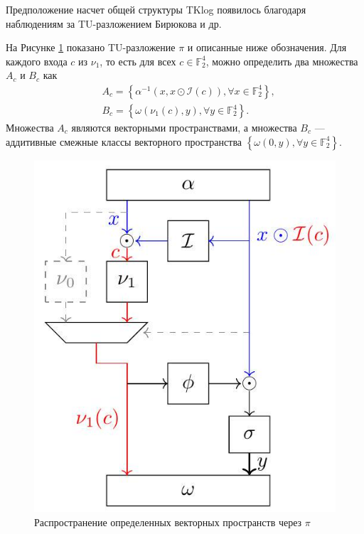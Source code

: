 
Предположение насчет общей структуры TKlog появилось благодаря наблюдениям за TU-разложением Бирюкова и др.

На Рисунке \ref{fig:figC01} показано TU-разложение $\pi$ и описанные ниже обозначения. Для каждого входа $c$ из $\nu_{1}$, то есть для всех $c \in \mathbb{F}_{2}^{4}$, можно определить два множества $A_{c}$ и $B_{c}$ как
$$
\begin{aligned}
& A_{c}=\left\{\alpha^{-1}(x, x \odot \mathcal{I}(c)), \forall x \in \mathbb{F}_{2}^{4}\right\}, \\
& B_{c}=\left\{\omega\left(\nu_{1}(c), y\right), \forall y \in \mathbb{F}_{2}^{4}\right\} .
\end{aligned}
$$
Множества $A_{c}$ являются векторными пространствами, а множества $B_{c}$ — аддитивные смежные классы векторного пространства $\left\{\omega(0, y), \forall y \in \mathbb{F}_{2}^{4}\right\}$.

\begin{figure}
        \centering
        \includegraphics[scale=0.5]{contents/pics/C_pi.jpg}
        \caption{Распространение определенных векторных пространств через \(\pi\)}
        \label{fig:figC01}
\end{figure}

